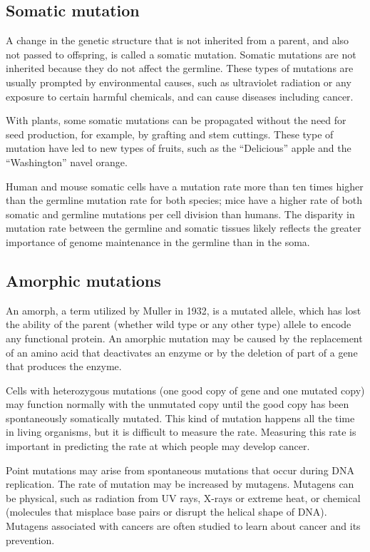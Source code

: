\hypertarget{somatic-mutation}{%
\subsection{Somatic mutation}\label{somatic-mutation}}

A change in the genetic structure that is not inherited from a parent, and also not passed to offspring, is called a somatic mutation. Somatic mutations are not inherited because they do not affect the germline. These types of mutations are usually prompted by environmental causes, such as ultraviolet radiation or any exposure to certain harmful chemicals, and can cause diseases including cancer.

With plants, some somatic mutations can be propagated without the need for seed production, for example, by grafting and stem cuttings. These type of mutation have led to new types of fruits, such as the ``Delicious'' apple and the ``Washington'' navel orange.

Human and mouse somatic cells have a mutation rate more than ten times higher than the germline mutation rate for both species; mice have a higher rate of both somatic and germline mutations per cell division than humans. The disparity in mutation rate between the germline and somatic tissues likely reflects the greater importance of genome maintenance in the germline than in the soma.

\hypertarget{amorphic-mutations}{%
\subsection{Amorphic mutations}\label{amorphic-mutations}}

An amorph, a term utilized by Muller in 1932, is a mutated allele, which has lost the ability of the parent (whether wild type or any other type) allele to encode any functional protein. An amorphic mutation may be caused by the replacement of an amino acid that deactivates an enzyme or by the deletion of part of a gene that produces the enzyme.

Cells with heterozygous mutations (one good copy of gene and one mutated copy) may function normally with the unmutated copy until the good copy has been spontaneously somatically mutated. This kind of mutation happens all the time in living organisms, but it is difficult to measure the rate. Measuring this rate is important in predicting the rate at which people may develop cancer.

Point mutations may arise from spontaneous mutations that occur during DNA replication. The rate of mutation may be increased by mutagens. Mutagens can be physical, such as radiation from UV rays, X-rays or extreme heat, or chemical (molecules that misplace base pairs or disrupt the helical shape of DNA). Mutagens associated with cancers are often studied to learn about cancer and its prevention.


